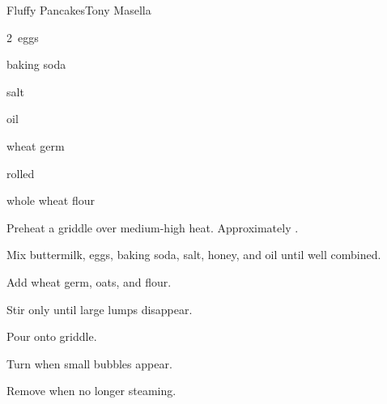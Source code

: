 \begin{recipe}{Fluffy Pancakes}{Tony Masella}{}

\begin{ingredients}
\item {} 
\item 2~eggs
\item {} baking soda
\item \tp{\half} salt
\item \C{\quarter} oil
\item \C{\quarter} 
\item \C{\quarter} wheat germ
\item \C{\quarter} rolled 
\item \C{1\half} whole wheat flour
\end{ingredients}

\begin{directions}
\item Preheat a griddle over medium-high heat. Approximately .
\item Mix buttermilk, eggs, baking soda, salt, honey, and oil until well combined.
\item Add wheat germ, oats, and flour.
\item Stir only until large lumps disappear.
\item Pour onto griddle.
\item Turn when small bubbles appear.
\item Remove when no longer steaming.
\end{directions}

\end{recipe}
